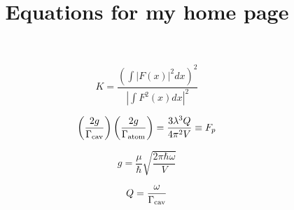 \documentclass[preprint, amsmath,amssymfig9b,superscriptaddress]{revtex4}
\begin{document}
\title{Equations for my home page}




\maketitle

\begin{equation}
K=\frac{\left(\int |F(x)|^2 dx\right)^2}{\left|\int F^2 (x) dx\right|^2}
\end{equation}

\begin{equation}
\left(\frac{2g}{\Gamma_{\rm cav}}\right)\left(\frac{2g}{\Gamma_{\rm atom}}\right)=\frac{3\lambda^3 Q}{4\pi^2 V}\equiv F_p
\end{equation}

\begin{equation}
g=\frac{\mu}{\hbar}\sqrt{\frac{2\pi \hbar \omega}{V}}
\end{equation}

\begin{equation}
Q=\frac{\omega}{\Gamma_{\rm cav}}
\end{equation}
\end{document}
